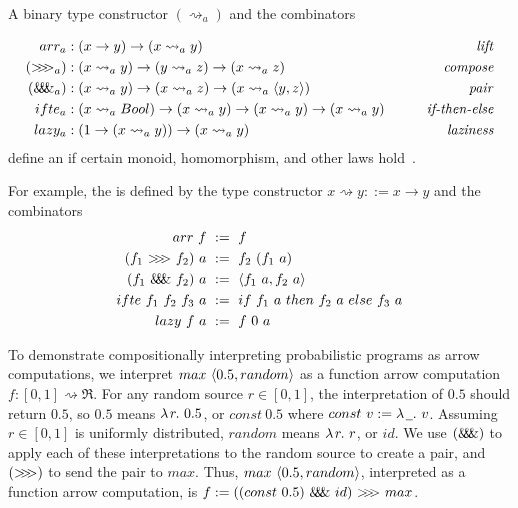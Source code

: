 \documentclass{llncs}
\newenvironment{displaybreaks}%
{%
	\begingroup%
	\allowdisplaybreaks%
}%
{%
	\endgroup%
	\ignorespacesafterend%
}
\newcommand{\arrow}{\rightsquigarrow}
\newcommand{\acomp}{\ensuremath{{>}\mspace{-6mu}{>}\mspace{-6mu}{>}}}
\newcommand{\apair}{\ensuremath{\mathit{\&\mspace{-7.5mu}\&\mspace{-7.5mu}\&}}}
\newcommand{\gen}{_a}
\begin{document}
\begin{definition}A binary type constructor $(\arrow\gen)$ and the combinators
\begin{displaybreaks}
\begin{equation*}
\begin{aligned}
	arr\gen &: (x \to y) \to (x \arrow\gen y)
		& \text{\emph{lift}}
\nobreak\\
	(\acomp\gen) &: (x \arrow\gen y) \to (y \arrow\gen z) \to (x \arrow\gen z)
		& \text{\emph{compose}}
\\
	(\apair\gen) &: (x \arrow\gen y) \to (x \arrow\gen z) \to (x \arrow\gen \pair{y,z})
		& \text{\emph{pair}}
\\
	ifte\gen &: (x \arrow\gen Bool) \to (x \arrow\gen y) \to (x \arrow\gen y) \to (x \arrow\gen y)
		\tab\tab& \text{\emph{if-then-else}}
\nobreak\\
	lazy\gen &: (1 \to (x \arrow\gen y)) \to (x \arrow\gen y)
		& \text{\emph{laziness}}
\label{eqn:arrow-combinators}
\end{aligned}
\end{equation*}
\end{displaybreaks}
define an  if certain monoid, homomorphism, and other laws hold~\cite{cit:hughes-2000scp-arrows}.
\end{definition}

For example, the  is defined by the type constructor $x \arrow y ::= x \to y$ and the combinators
\begin{equation}
\begin{aligned}
	arr~f &\ := \ f \\
	(f_1~\acomp~f_2)~a &\ := \ f_2~(f_1~a) \\
	(f_1~\apair~f_2)~a &\ := \ \pair{f_1~a,f_2~a} \\
	ifte~f_1~f_2~f_3~a &\ := \ if~f_1~a~then~f_2~a~else~f_3~a \\
	lazy~f~a &\ :=\ f~0~a
\label{eqn:function-arrow}
\end{aligned}
\end{equation}

To demonstrate compositionally interpreting probabilistic programs as arrow computations, we interpret $max~\langle{0.5,random}\rangle$ as a function arrow computation $f : [0,1] \arrow \Re$.
For any random source $r \in [0,1]$, the interpretation of $0.5$ should return $0.5$, so $0.5$ means $\lambda\mspace{2mu}{r}\ldotp\, 0.5$, or $const~0.5$ where $const~v := \lambda\mspace{2mu}{\underbar{\ \,}}\ldotp\,v$.
Assuming $r \in [0,1]$ is uniformly distributed, $random$ means $\lambda\mspace{2mu}{r}\ldotp\, r$, or $id$.
We use $(\apair)$ to apply each of these interpretations to the random source to create a pair, and $(\acomp)$ to send the pair to $max$.
Thus, $max~\langle{0.5,random}\rangle$, interpreted as a function arrow computation, is $f := ((const~0.5)~\apair~id)~\acomp~max$.
\end{document}
